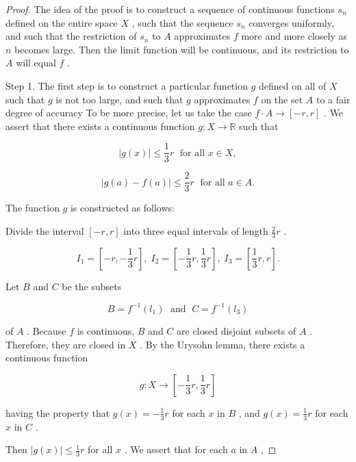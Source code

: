 \begin{proof}
The idea of the proof is to construct a sequence of continuous functions \({s}_{n}\) defined on the entire space \(X\) , such that the sequence \({s}_{n}\) converges uniformly, and such that the restriction of \({s}_{n}\) to \(A\) approximates \(f\) more and more closely as \(n\) becomes large. Then the limit function will be continuous, and its restriction to \(A\) will equal \(f\) .

Step 1. The first step is to construct a particular function \(g\) defined on all of \(X\) such that \(g\) is not too large, and such that \(g\) approximates \(f\) on the set \(A\) to a fair degree of accuracy To be more precise, let us take the case \(f \cdot  A \rightarrow  \left\lbrack  {-r,r}\right\rbrack\) . We assert that there exists a continuous function \(g : X \rightarrow  \mathbb{R}\) such that

\[
\left| {g\left( x\right) }\right|  \leq  \frac{1}{3}r\;\text{ for all }x \in  X,
\]

\[
\left| {g\left( a\right)  - f\left( a\right) }\right|  \leq  \frac{2}{3}r\;\text{ for all }a \in  A.
\]

The function \(g\) is constructed as follows:

Divide the interval \(\left\lbrack  {-r,r}\right\rbrack\) into three equal intervals of length \(\frac{2}{3}r\) .

\[
{I}_{1} = \left\lbrack  {-r, - \frac{1}{3}r}\right\rbrack  ,\;{I}_{2} = \left\lbrack  {-\frac{1}{3}r,\frac{1}{3}r}\right\rbrack  ,\;{I}_{3} = \left\lbrack  {\frac{1}{3}r,r}\right\rbrack  .
\]

Let \(B\) and \(C\) be the subsets

\[
B = {f}^{-1}\left( {l}_{1}\right) \;\text{ and }\;C = {f}^{-1}\left( {l}_{3}\right)
\]

of \(A\) . Because \(f\) is continuous, \(B\) and \(C\) are closed disjoint subsets of \(A\) . Therefore, they are closed in \(X\) . By the Urysohn lemma, there exists a continuous function

\[
g : X \rightarrow  \left\lbrack  {-\frac{1}{3}r,\frac{1}{3}r}\right\rbrack
\]

having the property that \(g\left( x\right)  =  - \frac{1}{3}r\) for each \(x\) in \(B\) , and \(g\left( x\right)  = \frac{1}{3}r\) for each \(x\) in \(C\) .

Then \(\left| {g\left( x\right) }\right|  \leq  \frac{1}{3}r\) for all \(x\) . We assert that for each \(a\) in \(A\) ,


\end{proof}
